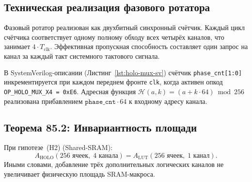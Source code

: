\subsection{Техническая реализация фазового ротатора}
\label{subsec:glava85-phase-rotator}

Фазовый ротатор реализован как двухбитный синхронный счётчик.
Каждый цикл счётчика соответствует одному полному обходу всех
четырёх каналов, что занимает $4 \cdot T_{\mathrm{clk}}$.
Эффективная пропускная способность составляет один запрос на канал
за каждый такт системного тактового сигнала.

В SystemVerilog-описании (Листинг~\ref{lst:holo-mux-sv})
счётчик \texttt{phase\_cnt[1:0]} инкрементируется при каждом
переднем фронте \texttt{clk}, когда активен опкод
\texttt{OP\_HOLO\_MUX\_X4 = 0xE6}.
Адресная функция $\mathcal{H}(a, k) = (a + k \cdot 64) \bmod 256$
реализована прибавлением $\texttt{phase\_cnt} \cdot 64$
к входному адресу канала.

\subsection{Теорема 85.2: Инвариантность площади}
\label{subsec:glava85-thm2}

\begin{theorem}
\label{thm:iso-area-invariance}
При гипотезе~(H2) (Shared-SRAM):
\[
  A_{\mathrm{HOLO}}(256{}\text{ ячеек},\;4{}\text{ канала})
  = A_{\mathrm{LUT}}(256{}\text{ ячеек},\;1{}\text{ канал}).
\]
Иными словами, добавление трёх дополнительных логических каналов
не увеличивает физическую площадь SRAM-макроса.
\end{theorem}

